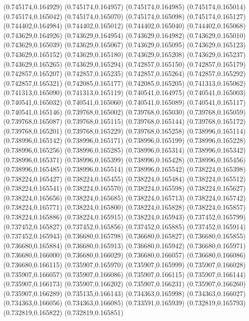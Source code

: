 (0.745174,0.164929)
(0.745174,0.164957)
(0.745174,0.164985)
(0.745174,0.165014)
(0.745174,0.165042)
(0.745174,0.165070)
(0.745174,0.165098)
(0.745174,0.165127)
(0.744402,0.164984)
(0.744402,0.165012)
(0.744402,0.165040)
(0.744402,0.165068)
(0.743629,0.164926)
(0.743629,0.164954)
(0.743629,0.164982)
(0.743629,0.165010)
(0.743629,0.165039)
(0.743629,0.165067)
(0.743629,0.165095)
(0.743629,0.165123)
(0.743629,0.165152)
(0.743629,0.165180)
(0.743629,0.165208)
(0.743629,0.165237)
(0.743629,0.165265)
(0.743629,0.165294)
(0.742857,0.165150)
(0.742857,0.165179)
(0.742857,0.165207)
(0.742857,0.165235)
(0.742857,0.165264)
(0.742857,0.165292)
(0.742857,0.165321)
(0.742085,0.165177)
(0.742085,0.165205)
(0.741313,0.165062)
(0.741313,0.165090)
(0.741313,0.165119)
(0.740541,0.164975)
(0.740541,0.165003)
(0.740541,0.165032)
(0.740541,0.165060)
(0.740541,0.165089)
(0.740541,0.165117)
(0.740541,0.165146)
(0.739768,0.165002)
(0.739768,0.165030)
(0.739768,0.165059)
(0.739768,0.165087)
(0.739768,0.165115)
(0.739768,0.165144)
(0.739768,0.165172)
(0.739768,0.165201)
(0.739768,0.165229)
(0.739768,0.165258)
(0.738996,0.165114)
(0.738996,0.165142)
(0.738996,0.165171)
(0.738996,0.165199)
(0.738996,0.165228)
(0.738996,0.165256)
(0.738996,0.165285)
(0.738996,0.165314)
(0.738996,0.165342)
(0.738996,0.165371)
(0.738996,0.165399)
(0.738996,0.165428)
(0.738996,0.165456)
(0.738996,0.165485)
(0.738996,0.165514)
(0.738996,0.165542)
(0.738224,0.165398)
(0.738224,0.165427)
(0.738224,0.165455)
(0.738224,0.165484)
(0.738224,0.165512)
(0.738224,0.165541)
(0.738224,0.165570)
(0.738224,0.165598)
(0.738224,0.165627)
(0.738224,0.165656)
(0.738224,0.165685)
(0.738224,0.165713)
(0.738224,0.165742)
(0.738224,0.165771)
(0.738224,0.165800)
(0.738224,0.165828)
(0.738224,0.165857)
(0.738224,0.165886)
(0.738224,0.165915)
(0.738224,0.165943)
(0.737452,0.165799)
(0.737452,0.165827)
(0.737452,0.165856)
(0.737452,0.165885)
(0.737452,0.165914)
(0.737452,0.165943)
(0.736680,0.165798)
(0.736680,0.165827)
(0.736680,0.165855)
(0.736680,0.165884)
(0.736680,0.165913)
(0.736680,0.165942)
(0.736680,0.165971)
(0.736680,0.166000)
(0.736680,0.166029)
(0.736680,0.166057)
(0.736680,0.166086)
(0.736680,0.166115)
(0.735907,0.165970)
(0.735907,0.165999)
(0.735907,0.166028)
(0.735907,0.166057)
(0.735907,0.166086)
(0.735907,0.166115)
(0.735907,0.166144)
(0.735907,0.166173)
(0.735907,0.166202)
(0.735907,0.166231)
(0.735907,0.166260)
(0.735907,0.166289)
(0.735135,0.166143)
(0.734363,0.165998)
(0.734363,0.166027)
(0.734363,0.166056)
(0.734363,0.166085)
(0.733591,0.165939)
(0.732819,0.165793)
(0.732819,0.165822)
(0.732819,0.165851)
